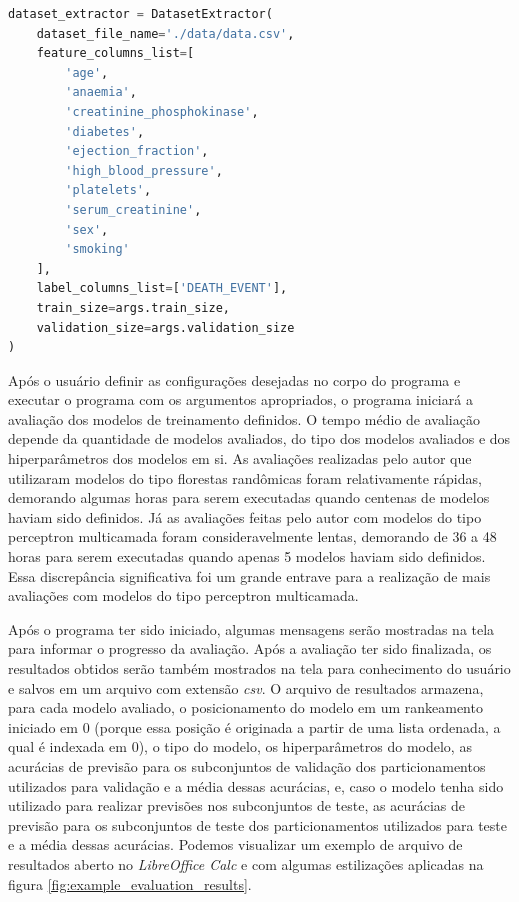 \lstset{caption=Construção do extrator de conjunto de dados no programa de avaliação dos modelos de treinamento, label=list:main_dataset_extractor}
\begin{lstlisting}[language=python]
dataset_extractor = DatasetExtractor(
    dataset_file_name='./data/data.csv',
    feature_columns_list=[
        'age',
        'anaemia',
        'creatinine_phosphokinase',
        'diabetes',
        'ejection_fraction',
        'high_blood_pressure',
        'platelets',
        'serum_creatinine',
        'sex',
        'smoking'
    ],
    label_columns_list=['DEATH_EVENT'],
    train_size=args.train_size,
    validation_size=args.validation_size
)
\end{lstlisting}

Após o usuário definir as configurações desejadas no corpo do programa e executar o programa com os argumentos apropriados, o programa iniciará a avaliação dos modelos de treinamento definidos. O tempo médio de avaliação depende da quantidade de modelos avaliados, do tipo dos modelos avaliados e dos hiperparâmetros dos modelos em si. As avaliações realizadas pelo autor que utilizaram modelos do tipo florestas randômicas foram relativamente rápidas, demorando algumas horas para serem executadas quando centenas de modelos haviam sido definidos. Já as avaliações feitas pelo autor com modelos do tipo perceptron multicamada foram consideravelmente lentas, demorando de 36 a 48 horas para serem executadas quando apenas 5 modelos haviam sido definidos. Essa discrepância significativa foi um grande entrave para a realização de mais avaliações com modelos do tipo perceptron multicamada.

Após o programa ter sido iniciado, algumas mensagens serão mostradas na tela para informar o progresso da avaliação. Após a avaliação ter sido finalizada, os resultados obtidos serão também mostrados na tela para conhecimento do usuário e salvos em um arquivo com extensão \textit{csv}. O arquivo de resultados armazena, para cada modelo avaliado, o posicionamento do modelo em um rankeamento iniciado em 0 (porque essa posição é originada a partir de uma lista ordenada, a qual é indexada em 0), o tipo do modelo, os hiperparâmetros do modelo, as acurácias de previsão para os subconjuntos de validação dos particionamentos utilizados para validação e a média dessas acurácias, e, caso o modelo tenha sido utilizado para realizar previsões nos subconjuntos de teste, as acurácias de previsão para os subconjuntos de teste dos particionamentos utilizados para teste e a média dessas acurácias. Podemos visualizar um exemplo de arquivo de resultados aberto no \textit{LibreOffice Calc} e com algumas estilizações aplicadas na figura \ref{fig:example_evaluation_results}.

